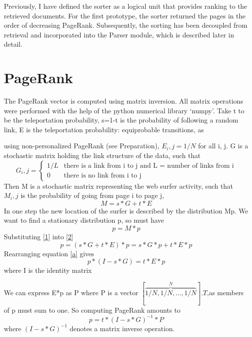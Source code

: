 \documentclass[12pt,notitlepage,twoside]{scrreprt}
\begin{document}
Previously, I have defined the sorter as a logical unit that provides ranking
to the retrieved documents. For the first prototype, the sorter returned the
pages in the order of decreasing PageRank.  Subsequently, the sorting has been
decoupled from retrieval and incorporated into the Parser module, which is
described later in detail.

\section{PageRank} 
\label{impl:pr}
The PageRank vector is computed using matrix inversion. All matrix operations
were performed with the help of the python numerical library `numpy'.  Take t
to be the teleportation probability, s=1-t is the probability of following a
random link, E is the teleportation probability: equiprobable transitions, as

using non-personalized PageRank (see Preparation), \(E_i,j = 1/N\) for all i,
j. G is a stochastic matrix holding the link structure of the data, such that 
\begin{equation*}
  G_i,j = \begin{cases}
    1/L & \text{there is a link from i to j and L = number of links from i}\\
    0   & \text{there is no link from i to j}
  \end{cases}
\end{equation*}
Then M is a stochastic matrix representing the web surfer activity, such
that \(M_i,j\) is the probability of going from page i to page j, 
\begin{equation} \label{1}
  M = s*G +t*E
\end{equation}
In one step the new location of the surfer is described by the distribution Mp.
We want to find a stationary distribution p, so must have
\begin{equation}\label{2}
  p = M*p
\end{equation}
Substituting \ref{1} into \ref{2}
\begin{equation} \label{a}
  p = (s*G+t*E)*p = s*G*p + t*E*p
\end{equation}
Rearranging equation \ref{a} gives
\begin{equation}
  p*(I-s*G) = t*E*p
\end{equation}
where I is the identity matrix

We can express E*p as P where P is a vector
\([\overbrace{1/N,1/N,\dots,1/N}^N].T\),as members of p must sum to one.
So computing PageRank amounts to
\begin{equation}
p  = t*(I-s*G)^{-1}*P
\end{equation}
where \((I-s*G)^{-1}\) denotes a matrix inverse operation.
\end{document}
